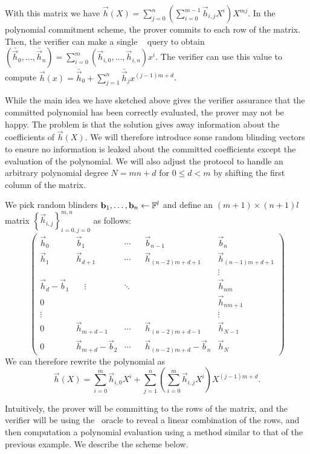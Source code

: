 With this matrix we have $\vec{h}(X)=\sum_{j=0}^n(\sum_{i=0}^{m-1}\vec{h}_{i,j}X^i)X^{mj}$. In the polynomial commitment scheme, the prover commits to each row of the matrix. Then, the verifier can make a single \ILC~ query to obtain $(\bar{\vec{h}}_0,\ldots,\bar{\vec{h}}_n) = \sum_{i=0}^{m} (\vec{h}_{i,0},\ldots,\vec{h}_{i,n}) x^i$. The verifier can use this value to compute $\vec{h}(x) = \bar{\vec{h}}_0+\sum_{j=1}^{n} \bar{\vec{h}}_{j} x^{(j-1)m+d}$.

While the main idea we have sketched above gives the verifier assurance that the committed polynomial has been correctly evaluated, the prover may not be happy. The problem is that the solution gives away information about the coefficients of $\vec{h}(X)$. We will therefore introduce some random blinding vectors to ensure no information is leaked about the committed coefficients except the evaluation of the polynomial. We will also adjust the protocol to handle an arbitrary polynomial degree $N=mn+d$ for $0\leq d<m$ by shifting the first column of the matrix.

We pick random blinders $\mathbf{b}_1,\ldots,\mathbf{b}_n\gets \mathbb{F}^l$ and define an $(m+1)\times (n+1)l$ matrix $\left\{ \vec{h}_{i,j} \right\}_{i=0,j=0}^{m,n}$ as follows:
$$\left(\begin{array}{lllll}
\vec{h}_0 & \vec{b}_{1} & \cdots & \vec{b}_{n-1} & \vec{b}_n \\
\vec{h}_1 & \vec{h}_{d+1} & \cdots & \vec{h}_{(n-2)m+d+1} & \vec{h}_{(n-1)m+d+1}\\
&&&& \vdots \\
\vec{h}_d-\vec{b}_1 & \quad \vdots & \ddots \quad & & \vec{h}_{nm}\\
0 &&&& \vec{h}_{nm+1}\\
\vdots &&&& \vdots  \\
0 & \vec{h}_{m+d-1}  & \cdots  & \vec{h}_{(n-2)m+d-1} & \vec{h}_{N-1} \\
0 & \vec{h}_{m+d}-\vec{b}_2 & \cdots & \vec{h}_{(n-2)m+d}-\vec{b}_n & \vec{h}_{N}
\end{array} \right)$$
We can therefore rewrite the polynomial as $$\vec{h}(X)=\sum_{i=0}^m\vec{h}_{i,0}X^i +\sum_{j=1}^{n} \left(\sum_{i=0}^m\vec{h}_{i,j}X^i \right)X^{(j-1)m+d}.$$

Intuitively, the prover will be committing to the rows of the matrix, and the verifier will be using the \ILCopen\ oracle to reveal a linear combination of the rows, and then computation a polynomial evaluation using a method similar to that of the previous example. We describe the scheme below.

